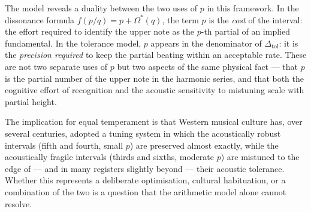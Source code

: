 \documentclass[11pt,a4paper]{article}
\newcommand{\Os}{\Omega^{*}}
\begin{document}
The model reveals a duality between the two uses of $p$ in this framework.
In the dissonance formula $f(p/q) = p + \Os(q)$, the term $p$ is the
\emph{cost} of the interval: the effort required to identify the upper note
as the $p$-th partial of an implied fundamental. In the tolerance model, $p$
appears in the denominator of $\Delta_{\mathrm{tol}}$: it is the
\emph{precision required} to keep the partial beating within an acceptable
rate. These are not two separate uses of $p$ but two aspects of the same
physical fact --- that $p$ is the partial number of the upper note in the
harmonic series, and that both the cognitive effort of recognition and the
acoustic sensitivity to mistuning scale with partial height.

The implication for equal temperament is that Western musical culture has, over
several centuries, adopted a tuning system in which the acoustically robust
intervals (fifth and fourth, small $p$) are preserved almost exactly, while
the acoustically fragile intervals (thirds and sixths, moderate $p$) are
mistuned to the edge of --- and in many registers slightly beyond --- their
acoustic tolerance. Whether this represents a deliberate optimisation,
cultural habituation, or a combination of the two is a question that the
arithmetic model alone cannot resolve.

\end{document}
